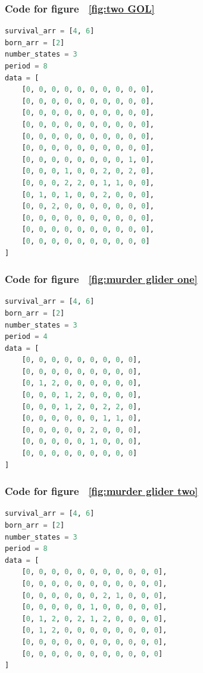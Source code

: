 \documentclass[12pt]{article}
\numberwithin{figure}{section} %
\begin{document}
\subsubsection{Code for figure ~\ref{fig:two GOL}}
\label{subsubsection:two GOL}
\begin{lstlisting}[language = Python]
survival_arr = [4, 6]
born_arr = [2]
number_states = 3
period = 8
data = [
    [0, 0, 0, 0, 0, 0, 0, 0, 0, 0],
    [0, 0, 0, 0, 0, 0, 0, 0, 0, 0],
    [0, 0, 0, 0, 0, 0, 0, 0, 0, 0],
    [0, 0, 0, 0, 0, 0, 0, 0, 0, 0],
    [0, 0, 0, 0, 0, 0, 0, 0, 0, 0],
    [0, 0, 0, 0, 0, 0, 0, 0, 0, 0],
    [0, 0, 0, 0, 0, 0, 0, 0, 1, 0],
    [0, 0, 0, 1, 0, 0, 2, 0, 2, 0],
    [0, 0, 0, 2, 2, 0, 1, 1, 0, 0],
    [0, 1, 0, 1, 0, 0, 2, 0, 0, 0],
    [0, 0, 2, 0, 0, 0, 0, 0, 0, 0],
    [0, 0, 0, 0, 0, 0, 0, 0, 0, 0],
    [0, 0, 0, 0, 0, 0, 0, 0, 0, 0],
    [0, 0, 0, 0, 0, 0, 0, 0, 0, 0]
]
\end{lstlisting}

\subsubsection{Code for figure ~\ref{fig:murder glider one}}
\label{subsubsection:murder glider one}
\begin{lstlisting}[language = Python]
survival_arr = [4, 6]
born_arr = [2]
number_states = 3
period = 4
data = [
    [0, 0, 0, 0, 0, 0, 0, 0, 0],
    [0, 0, 0, 0, 0, 0, 0, 0, 0],
    [0, 1, 2, 0, 0, 0, 0, 0, 0],
    [0, 0, 0, 1, 2, 0, 0, 0, 0],
    [0, 0, 0, 1, 2, 0, 2, 2, 0],
    [0, 0, 0, 0, 0, 0, 1, 1, 0],
    [0, 0, 0, 0, 0, 2, 0, 0, 0],
    [0, 0, 0, 0, 0, 1, 0, 0, 0],
    [0, 0, 0, 0, 0, 0, 0, 0, 0]
]
\end{lstlisting}

\subsubsection{Code for figure ~\ref{fig:murder glider two}}
\label{subsubsection:murder glider two}
\begin{lstlisting}[language = Python]
survival_arr = [4, 6]
born_arr = [2]
number_states = 3
period = 8
data = [
    [0, 0, 0, 0, 0, 0, 0, 0, 0, 0, 0],
    [0, 0, 0, 0, 0, 0, 0, 0, 0, 0, 0],
    [0, 0, 0, 0, 0, 0, 2, 1, 0, 0, 0],
    [0, 0, 0, 0, 0, 1, 0, 0, 0, 0, 0],
    [0, 1, 2, 0, 2, 1, 2, 0, 0, 0, 0],
    [0, 1, 2, 0, 0, 0, 0, 0, 0, 0, 0],
    [0, 0, 0, 0, 0, 0, 0, 0, 0, 0, 0], 
    [0, 0, 0, 0, 0, 0, 0, 0, 0, 0, 0]
]
\end{lstlisting}
\end{document}
